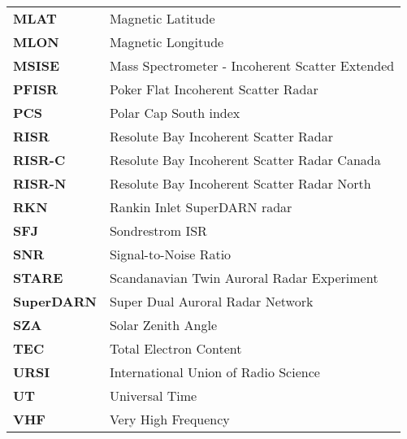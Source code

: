 \begin{longtable}{ll}
\textbf{MLAT} & Magnetic Latitude \\
\textbf{MLON} & Magnetic Longitude \\
\textbf{MSISE} & Mass Spectrometer - Incoherent Scatter Extended \\
\textbf{PFISR} & Poker Flat Incoherent Scatter Radar \\
\textbf{PCS} & Polar Cap South index \\
\textbf{RISR} & Resolute Bay Incoherent Scatter Radar \\
\textbf{RISR-C} & Resolute Bay Incoherent Scatter Radar Canada \\
\textbf{RISR-N} & Resolute Bay Incoherent Scatter Radar North \\
\textbf{RKN} & Rankin Inlet SuperDARN radar \\
\textbf{SFJ} & Sondrestrom ISR \\
\textbf{SNR} & Signal-to-Noise Ratio \\
\textbf{STARE} & Scandanavian Twin Auroral Radar Experiment \\
\textbf{SuperDARN} & Super Dual Auroral Radar Network \\
\textbf{SZA} & Solar Zenith Angle \\
\textbf{TEC} & Total Electron Content \\
\textbf{URSI} & International Union of Radio Science \\
\textbf{UT} & Universal Time \\
\textbf{VHF} & Very High Frequency \\
\end{longtable}